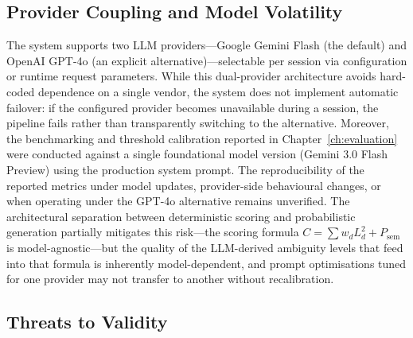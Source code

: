 \subsection{Provider Coupling and Model Volatility}

The system supports two LLM providers---Google Gemini Flash (the default) and OpenAI GPT-4o (an explicit alternative)---selectable per session via configuration or runtime request parameters. While this dual-provider architecture avoids hard-coded dependence on a single vendor, the system does not implement automatic failover: if the configured provider becomes unavailable during a session, the pipeline fails rather than transparently switching to the alternative. Moreover, the benchmarking and threshold calibration reported in Chapter~\ref{ch:evaluation} were conducted against a single foundational model version (Gemini 3.0 Flash Preview) using the production system prompt. The reproducibility of the reported metrics under model updates, provider-side behavioural changes, or when operating under the GPT-4o alternative remains unverified. The architectural separation between deterministic scoring and probabilistic generation partially mitigates this risk---the scoring formula $C = \sum w_d L_d^2 + P_{\text{sem}}$ is model-agnostic---but the quality of the LLM-derived ambiguity levels that feed into that formula is inherently model-dependent, and prompt optimisations tuned for one provider may not transfer to another without recalibration.

\subsection{Threats to Validity}
\label{sec:threats-validity}

